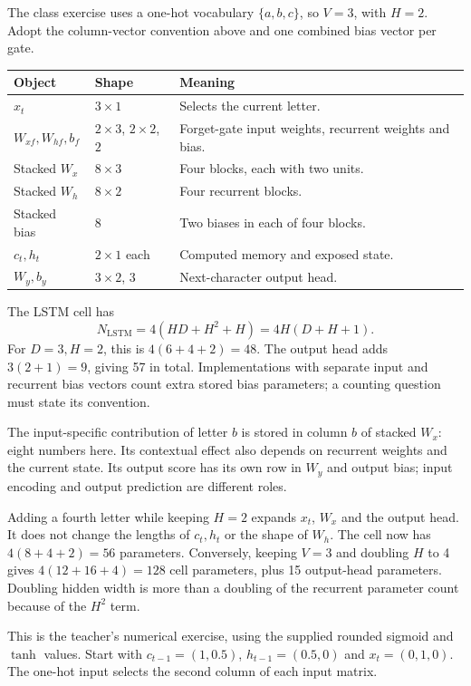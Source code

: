 \documentclass[11pt]{article}
\begin{document}
The class exercise uses a one-hot vocabulary $\{a,b,c\}$, so $V=3$, with $H=2$. Adopt the column-vector convention above and one combined bias vector per gate.
\begin{longtable}{@{}P{.25\textwidth}P{.20\textwidth}P{.45\textwidth}@{}}
\toprule Object & Shape & Meaning\\\midrule\endhead
$x_t$ & $3\times1$ & Selects the current letter.\\
$W_{xf},W_{hf},b_f$ & $2\times3$, $2\times2$, $2$ & Forget-gate input weights, recurrent weights and bias.\\
Stacked $W_x$ & $8\times3$ & Four blocks, each with two units.\\
Stacked $W_h$ & $8\times2$ & Four recurrent blocks.\\
Stacked bias & $8$ & Two biases in each of four blocks.\\
$c_t,h_t$ & $2\times1$ each & Computed memory and exposed state.\\
$W_y,b_y$ & $3\times2$, $3$ & Next-character output head.\\\bottomrule
\end{longtable}
The LSTM cell has
\[
\boxed{N_{\mathrm{LSTM}}=4(HD+H^2+H)=4H(D+H+1).}
\]
For $D=3,H=2$, this is $4(6+4+2)=48$. The output head adds $3(2+1)=9$, giving 57 in total. Implementations with separate input and recurrent bias vectors count extra stored bias parameters; a counting question must state its convention.

The input-specific contribution of letter $b$ is stored in column $b$ of stacked $W_x$: eight numbers here. Its contextual effect also depends on recurrent weights and the current state. Its output score has its own row in $W_y$ and output bias; input encoding and output prediction are different roles.

Adding a fourth letter while keeping $H=2$ expands $x_t$, $W_x$ and the output head. It does not change the lengths of $c_t,h_t$ or the shape of $W_h$. The cell now has $4(8+4+2)=56$ parameters. Conversely, keeping $V=3$ and doubling $H$ to 4 gives $4(12+16+4)=128$ cell parameters, plus 15 output-head parameters. Doubling hidden width is more than a doubling of the recurrent parameter count because of the $H^2$ term.

This is the teacher's numerical exercise, using the supplied rounded sigmoid and $\tanh$ values. Start with $c_{t-1}=(1,0.5)$, $h_{t-1}=(0.5,0)$ and $x_t=(0,1,0)$. The one-hot input selects the second column of each input matrix.
\end{document}
